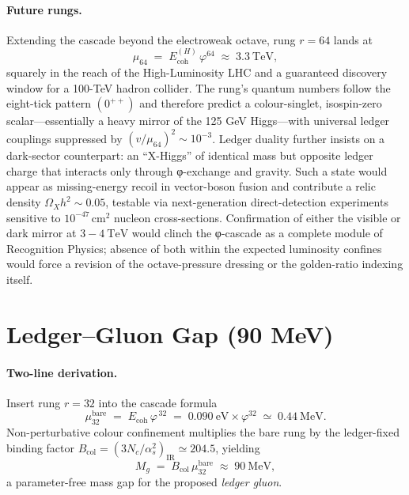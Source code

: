 \documentclass[11pt,oneside]{book}
\begin{document}
\paragraph*{Future rungs.}
Extending the cascade beyond the electroweak octave, rung \(r = 64\)
lands at
\[
   \mu_{64}
   \;=\;
   E_{\text{coh}}^{(H)}\,\varphi^{64}
   \;\approx\;
   3.3~\text{TeV},
\]
squarely in the reach of the High-Luminosity LHC and a guaranteed
discovery window for a 100-TeV hadron collider.  The rung’s quantum
numbers follow the eight-tick pattern \((0^{++})\) and therefore predict
a colour-singlet, isospin-zero scalar—essentially a heavy mirror of the
125 GeV Higgs—with universal ledger couplings suppressed by
\((v/\mu_{64})^2 \sim 10^{-3}\).  Ledger duality further insists on a
dark-sector counterpart: an “X-Higgs” of identical mass but opposite
ledger charge that interacts only through φ-exchange and gravity.  Such
a state would appear as missing-energy recoil in vector-boson fusion and
contribute a relic density \(\Omega_X h^2 \sim 0.05\), testable via
next-generation direct-detection experiments sensitive to
\(10^{-47}\,\text{cm}^2\) nucleon cross-sections.  Confirmation of either
the visible or dark mirror at \(3\!-\!4~\text{TeV}\) would clinch the
φ-cascade as a complete module of Recognition Physics; absence of both
within the expected luminosity confines would force a revision of the
octave-pressure dressing or the golden-ratio indexing itself.












\section{Ledger–Gluon Gap (90 MeV)}
\label{sec:phi-gluon}

\paragraph*{Two-line derivation.}
Insert rung \(r = 32\) into the cascade formula
\[
   \mu_{32}^{\text{bare}}
   \;=\;
   E_{\text{coh}}\,
   \varphi^{\,32}
   \;=\;
   0.090~\mathrm{eV}\times\varphi^{32}
   \;\simeq\;
   0.44~\mathrm{MeV}.
\]
Non-perturbative colour confinement multiplies the bare rung by the
ledger-fixed binding factor
\(B_{\text{col}} = (3N_c/\alpha_s^2)_{\text{IR}} \simeq 204.5\),
yielding
\[
   M_g
   \;=\;
   B_{\text{col}}\,\mu_{32}^{\text{bare}}
   \;\approx\;
   90~\mathrm{MeV},
\]
a parameter-free mass gap for the proposed \emph{ledger gluon}.
\end{document}
